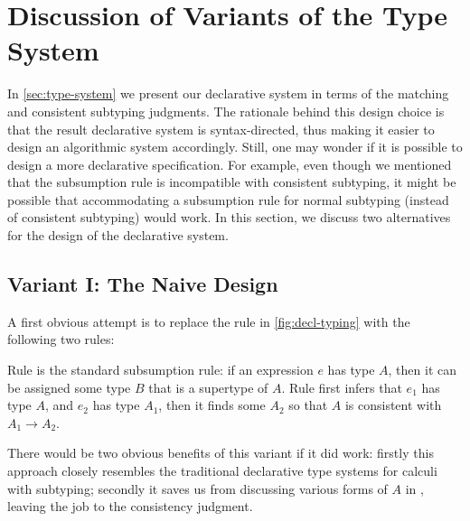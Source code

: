 \section{Discussion of Variants of the Type System}

In \cref{sec:type-system} we present our declarative system in terms of the
matching and consistent subtyping judgments. The rationale behind this design
choice is that the result declarative system is syntax-directed, thus making it
easier to design an algorithmic system accordingly. Still, one may wonder if it
is possible to design a more declarative specification. For example, even though
we mentioned that the subsumption rule is incompatible with consistent
subtyping, it might be possible that accommodating a subsumption rule for normal subtyping
(instead of consistent subtyping) would work. In this section, we discuss two
alternatives for the design of the declarative system.

\subsection{Variant I: The Naive Design}

A first obvious attempt is to replace the rule  in \cref{fig:decl-typing} with the
following two rules:
\begin{mathpar}

\end{mathpar}
Rule  is the standard subsumption rule: if an expression $e$ has type
$A$, then it can be assigned some type $B$ that is a supertype of $A$. Rule
 first infers that $e_1$ has type $A$, and $e_2$ has type $A_1$, then
it finds some $A_2$ so that $A$ is consistent with $A_1 \to A_2$.

There would be two obvious benefits of this variant if it did work:
firstly this approach closely resembles
the traditional declarative type systems for calculi with subtyping; secondly it
saves us from discussing various forms of $A$ in , leaving the job
to the consistency judgment.

